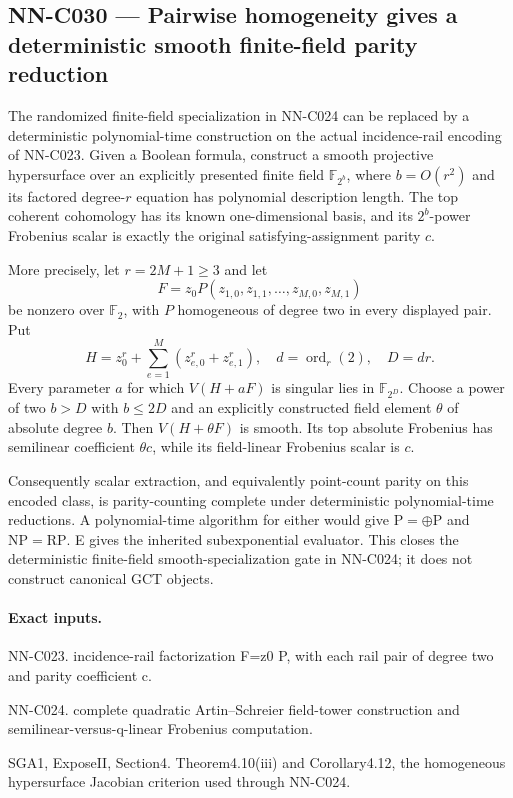 \subsection{NN-C030 --- Pairwise homogeneity gives a deterministic smooth finite-field parity reduction}
\begin{proposition}[NN-C030]
The randomized finite-field specialization in NN-C024 can be replaced by a deterministic polynomial-time construction on the actual incidence-rail encoding of NN-C023. Given a Boolean formula, construct a smooth projective hypersurface over an explicitly presented finite field $\mathbb F_{2^b}$, where $b=O(r^2)$ and its factored degree-$r$ equation has polynomial description length. The top coherent cohomology has its known one-dimensional basis, and its $2^b$-power Frobenius scalar is exactly the original satisfying-assignment parity $c$.

More precisely, let $r=2M+1\geq3$ and let
\[
 F=z_0P(z_{1,0},z_{1,1},\ldots,z_{M,0},z_{M,1})
\]
be nonzero over $\mathbb F_2$, with $P$ homogeneous of degree two in every displayed pair. Put
\[
 H=z_0^r+\sum_{e=1}^M(z_{e,0}^r+z_{e,1}^r),
 \quad d=\operatorname{ord}_r(2),\quad D=dr.
\]
Every parameter $a$ for which $V(H+aF)$ is singular lies in $\mathbb F_{2^D}$. Choose a power of two $b>D$ with $b\leq2D$ and an explicitly constructed field element $\theta$ of absolute degree $b$. Then $V(H+\theta F)$ is smooth. Its top absolute Frobenius has semilinear coefficient $\theta c$, while its field-linear Frobenius scalar is $c$.

Consequently scalar extraction, and equivalently point-count parity on this encoded class, is parity-counting complete under deterministic polynomial-time reductions. A polynomial-time algorithm for either would give $\mathrm P=\oplus\mathrm P$ and $\mathrm{NP}=\mathrm{RP}$. E gives the inherited subexponential evaluator. This closes the deterministic finite-field smooth-specialization gate in NN-C024; it does not construct canonical GCT objects.
\end{proposition}
\paragraph{Exact inputs.}
NN-C023. incidence-rail factorization F=z0 P, with each rail pair of degree two and parity coefficient c.

NN-C024. complete quadratic Artin--Schreier field-tower construction and semilinear-versus-q-linear Frobenius computation.

SGA1, ExposeII, Section4. Theorem4.10(iii) and Corollary4.12, the homogeneous hypersurface Jacobian criterion used through NN-C024.

